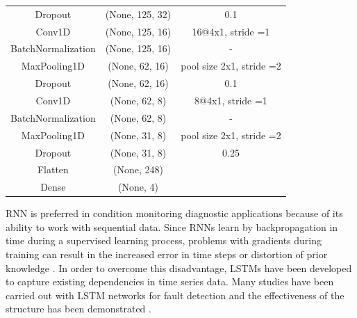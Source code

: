 \begin{table}[h]
{\begin{center}
\begin{tabular}{ccc}
			Dropout            & (None, 125, 32)   & 0.1                      \\
			Conv1D             & (None, 125, 16)   & 16@4x1, stride =1        \\
			BatchNormalization & (None, 125, 16)   & -                        \\
			MaxPooling1D       & (None, 62, 16)    & pool size 2x1, stride =2 \\
			Dropout            & (None, 62, 16)    & 0.1                      \\
			Conv1D             & (None, 62, 8)     & 8@4x1, stride =1         \\
			BatchNormalization & (None, 62, 8)     & -                        \\
			MaxPooling1D       & (None, 31, 8)     & pool size 2x1, stride =2 \\
			Dropout            & (None, 31, 8)     & 0.25                     \\
			Flatten            & (None, 248)       &                          \\
			Dense              & (None, 4)         &                         \\				
				\hline
			\end{tabular}
			\vspace{-6mm}
		\end{center}}
		\label{cnn}
\end{table}

RNN is preferred in condition monitoring diagnostic applications because of its ability to work with sequential data. Since RNNs learn by backpropagation in time during a supervised learning process, problems with gradients during training can result in the increased error in time steps or distortion of prior knowledge \cite{enshaei2019application}. In order to overcome this disadvantage, LSTMs have been developed to capture existing dependencies in time series data. Many studies have been carried out with LSTM networks for fault detection and the effectiveness of the structure has been demonstrated \cite{bai2021long,he2021fpga,khan2018review,sabir2019lstm}.

